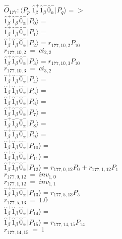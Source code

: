 \documentclass[14pt]{article}
\begin{document}
    $\hat{O}_{177}:  \langle{P_p}\vert \hat{1}_{\beta}^{+}\hat{1}_{\beta}^{-}\hat{0}_{\alpha}^{-} \vert{P_q}\rangle => $ \\ 
    $ \hat{1}_{\beta}^{+}\hat{1}_{\beta}^{-}\hat{0}_{\alpha}^{-} \vert{P_{0}}\rangle =  $ \\ 
    $ \hat{1}_{\beta}^{+}\hat{1}_{\beta}^{-}\hat{0}_{\alpha}^{-} \vert{P_{1}}\rangle =  $ \\ 
    $ \hat{1}_{\beta}^{+}\hat{1}_{\beta}^{-}\hat{0}_{\alpha}^{-} \vert{P_{2}}\rangle = {r}_{177,10,2}P_{10} $ \\ 
    ${r}_{177,10,2}\ =\ {ci}_{2,2} $ \\ 
    $ \hat{1}_{\beta}^{+}\hat{1}_{\beta}^{-}\hat{0}_{\alpha}^{-} \vert{P_{3}}\rangle = {r}_{177,10,3}P_{10} $ \\ 
    ${r}_{177,10,3}\ =\ {ci}_{3,2} $ \\ 
    $ \hat{1}_{\beta}^{+}\hat{1}_{\beta}^{-}\hat{0}_{\alpha}^{-} \vert{P_{4}}\rangle =  $ \\ 
    $ \hat{1}_{\beta}^{+}\hat{1}_{\beta}^{-}\hat{0}_{\alpha}^{-} \vert{P_{5}}\rangle =  $ \\ 
    $ \hat{1}_{\beta}^{+}\hat{1}_{\beta}^{-}\hat{0}_{\alpha}^{-} \vert{P_{6}}\rangle =  $ \\ 
    $ \hat{1}_{\beta}^{+}\hat{1}_{\beta}^{-}\hat{0}_{\alpha}^{-} \vert{P_{7}}\rangle =  $ \\ 
    $ \hat{1}_{\beta}^{+}\hat{1}_{\beta}^{-}\hat{0}_{\alpha}^{-} \vert{P_{8}}\rangle =  $ \\ 
    $ \hat{1}_{\beta}^{+}\hat{1}_{\beta}^{-}\hat{0}_{\alpha}^{-} \vert{P_{9}}\rangle =  $ \\ 
    $ \hat{1}_{\beta}^{+}\hat{1}_{\beta}^{-}\hat{0}_{\alpha}^{-} \vert{P_{10}}\rangle =  $ \\ 
    $ \hat{1}_{\beta}^{+}\hat{1}_{\beta}^{-}\hat{0}_{\alpha}^{-} \vert{P_{11}}\rangle =  $ \\ 
    $ \hat{1}_{\beta}^{+}\hat{1}_{\beta}^{-}\hat{0}_{\alpha}^{-} \vert{P_{12}}\rangle = {r}_{177,0,12}P_{0}+{r}_{177,1,12}P_{1} $ \\ 
    ${r}_{177,0,12}\ =\ {inv}_{1,0} $ \\ 
    ${r}_{177,1,12}\ =\ {inv}_{1,1} $ \\ 
    $ \hat{1}_{\beta}^{+}\hat{1}_{\beta}^{-}\hat{0}_{\alpha}^{-} \vert{P_{13}}\rangle = {r}_{177,5,13}P_{5} $ \\ 
    ${r}_{177,5,13}\ =\ 1.0 $ \\ 
    $ \hat{1}_{\beta}^{+}\hat{1}_{\beta}^{-}\hat{0}_{\alpha}^{-} \vert{P_{14}}\rangle =  $ \\ 
    $ \hat{1}_{\beta}^{+}\hat{1}_{\beta}^{-}\hat{0}_{\alpha}^{-} \vert{P_{15}}\rangle = {r}_{177,14,15}P_{14} $ \\ 
    ${r}_{177,14,15}\ =\ 1 $ \\ 
    
\end{document}
